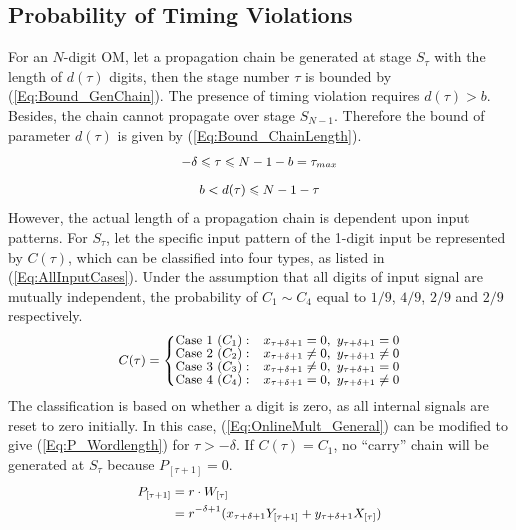 \documentclass{acm_proc_article-sp}
\begin{document}
\subsection{Probability of Timing Violations}
For an $N$-digit OM, let a propagation chain be generated at stage $S_{\tau}$ with the length of $d(\tau)$ digits, then the stage number $\tau$ is bounded by (\ref{Eq:Bound_GenChain}). The presence of timing violation requires $d(\tau)>b$. Besides, the chain cannot propagate over stage $S_{N-1}$. Therefore the bound of parameter $d(\tau)$ is given by (\ref{Eq:Bound_ChainLength}).
%
\begin{eqnarray}\label{Eq:Bound_GenChain}
\tiny
  -\delta\leqslant\tau\leqslant N-1-b=\tau_{max}
\end{eqnarray}
%
\vspace{-5ex}
\begin{eqnarray}\label{Eq:Bound_ChainLength}
  b<d(\tau)\leqslant N-1-\tau
\normalsize
\end{eqnarray}
%
However, the actual length of a propagation chain is dependent upon input patterns. For $S_{\tau}$, let the specific input pattern of the 1-digit input be represented by $C(\tau)$, which can be classified into four types, as listed in (\ref{Eq:AllInputCases}). Under the assumption that all digits of input signal are mutually independent, the probability of $C_1\sim C_4$ equal to $1/9$, $4/9$, $2/9$ and $2/9$ respectively.
%
\begin{eqnarray}\label{Eq:AllInputCases}
\footnotesize
  C(\tau)=\left\{\begin{matrix}
    \text{Case 1~(}C_1{):} & x_{\tau+\delta+1}=0,~y_{\tau+\delta+1}=0\\
    \text{Case 2~(}C_2{):} & x_{\tau+\delta+1}\neq0,~y_{\tau+\delta+1}\neq0\\
    \text{Case 3~(}C_3{):} & x_{\tau+\delta+1}\neq0,~y_{\tau+\delta+1}=0\\
    \text{Case 4~(}C_4{):} & x_{\tau+\delta+1}=0,~y_{\tau+\delta+1}\neq0
  \end{matrix}\right.
\normalsize
\end{eqnarray}
%
The classification is based on whether a digit is zero, as all internal signals are reset to zero initially. In this case, (\ref{Eq:OnlineMult_General}) can be modified to give (\ref{Eq:P_Wordlength}) for $\tau>-\delta$. If $C(\tau)=C_1$, no ``carry'' chain will be generated at $S_{\tau}$ because $P_{[\tau+1]}=0$.
%
\begin{eqnarray}\label{Eq:P_Wordlength}
\footnotesize
  \begin{aligned}
    P_{[\tau+1]} &= r\cdot W_{[\tau]}\\
                 &= r^{-\delta+1}(x_{\tau+\delta+1}Y_{[\tau+1]}+y_{\tau+\delta+1}X_{[\tau]})\\
  \end{aligned}
\normalsize
\end{eqnarray}
\end{document}
